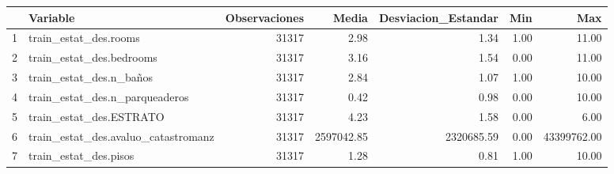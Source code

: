 \begin{table}[ht]
\centering
\begin{tabular}{rlrrrrr}
  \hline
 & Variable & Observaciones & Media & Desviacion\_Estandar & Min & Max \\ 
  \hline
1 & train\_estat\_des.rooms & 31317 & 2.98 & 1.34 & 1.00 & 11.00 \\ 
  2 & train\_estat\_des.bedrooms & 31317 & 3.16 & 1.54 & 0.00 & 11.00 \\ 
  3 & train\_estat\_des.n\_baños & 31317 & 2.84 & 1.07 & 1.00 & 10.00 \\ 
  4 & train\_estat\_des.n\_parqueaderos & 31317 & 0.42 & 0.98 & 0.00 & 10.00 \\ 
  5 & train\_estat\_des.ESTRATO & 31317 & 4.23 & 1.58 & 0.00 & 6.00 \\ 
  6 & train\_estat\_des.avaluo\_catastromanz & 31317 & 2597042.85 & 2320685.59 & 0.00 & 43399762.00 \\ 
  7 & train\_estat\_des.pisos & 31317 & 1.28 & 0.81 & 1.00 & 10.00 \\ 
   \hline
\end{tabular}
\end{table}
